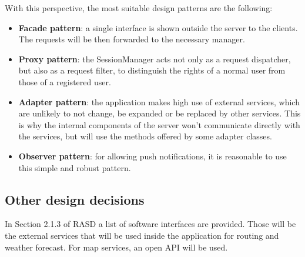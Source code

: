 With this perspective, the most suitable design patterns are the following:

\begin{itemize}
	\item \textbf{Facade pattern}: a single interface is shown outside the server to the clients. The requests will be then forwarded to the necessary manager.
	\item \textbf{Proxy pattern}: the SessionManager acts not only as a request dispatcher, but also as a request filter, to distinguish the rights of a normal user from those of a registered user.
	\item \textbf{Adapter pattern}: the application makes high use of external services, which are unlikely to not change, be expanded or be replaced by other services. This is why the internal components of the server won’t communicate directly with the services, but will use the methods offered by some adapter classes.
	\item \textbf{Observer pattern}: for allowing push notifications, it is reasonable to use this simple and robust pattern.
\end{itemize}

\subsection{Other design decisions}

In Section 2.1.3 of RASD a list of software interfaces are provided. Those will be the external services that will be used inside the application for routing and weather forecast. For map services, an open API will be used.